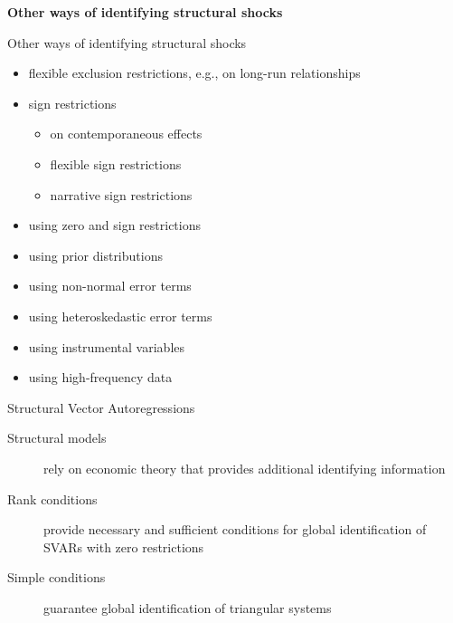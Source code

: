 \documentclass[notes,blackandwhite,mathsans,usenames,dvipsnames]{beamer}
\begin{document}
{
\begin{frame}

\begin{adjustwidth}{-0.5cm}{0cm}
\vspace{8.3cm}\Large
\textbf{{\color{mcxs5}Other ways of} {\color{mcxs1} identifying structural shocks}}
\end{adjustwidth}

\end{frame}
}



\begin{frame}{Other ways of identifying structural shocks}

\begin{itemize}[label=\textbullet,leftmargin = *]
\item {\color{purple}flexible exclusion restrictions, e.g., on long-run relationships}
\item {\color{purple}sign restrictions}
	\begin{itemize}[label=\textbullet,leftmargin = 0.9cm]
	\item {\color{purple}on contemporaneous effects}
	\item {\color{purple}flexible sign restrictions}
	\item {\color{purple}narrative sign restrictions}
	\end{itemize}
\item {\color{mcxs2}using zero and sign restrictions}
\item {\color{mcxs2}using prior distributions}
\item {\color{mcxs2}using non-normal error terms}
\item {\color{purple}using heteroskedastic error terms}
\item {\color{mcxs2}using instrumental variables}
\item {\color{mcxs2}using high-frequency data}
\end{itemize}

\end{frame}




{
\begin{frame}{{\color{white}Structural Vector Autoregressions}}
\begin{description}
\item[Structural models] {\color{mcxs5}rely on economic theory that provides additional identifying information}

\bigskip\item[Rank conditions] {\color{mcxs5}provide necessary and sufficient conditions for global identification of SVARs with zero restrictions}

\bigskip\item[Simple conditions] {\color{mcxs5}guarantee global identification of triangular systems}
\end{description}
\end{frame}
}
\end{document}
